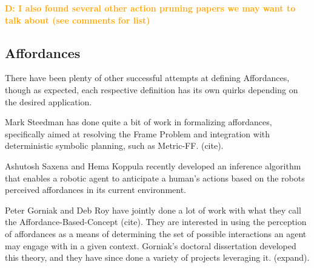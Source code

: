 \documentclass[]{article}
\newcommand{\dnote}[1]{\textcolor{Orange}{\textbf{D: #1}}}
\begin{document}
\dnote{I also found several other action pruning papers we may want to talk about (see comments for list)}


\subsection{Affordances}
There have been plenty of other successful attempts at defining Affordances, though as expected, each respective definition
has its own quirks depending on the desired application.

Mark Steedman has done quite a bit of work in formalizing affordances, specifically aimed at resolving the Frame Problem and integration with deterministic symbolic planning, such as Metric-FF. (cite).

Ashutosh Saxena and Hema Koppula recently developed an inference algorithm that enables a robotic agent to anticipate a human's actions based on the robots perceived affordances in its current environment. 

Peter Gorniak and Deb Roy have jointly done a lot of work with what they call the Affordance-Based-Concept (cite). They are interested
in using the perception of affordances as a means of determining the set of possible interactions an agent may engage with in a given context.
Gorniak's doctoral dissertation developed this theory, and they have since done a variety of projects leveraging it. (expand).
\end{document}
